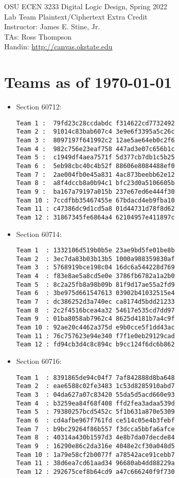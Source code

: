 \documentclass{article}
\newcommand{\mycourse}{\textsc OSU ECEN 3233 Digital Logic Design, Spring 2022}
\newcommand{\myassignment}{\textsc Lab Team Plaintext/Ciphertext Extra Credit}
\newcommand{\myinstructor}{Instructor: James E. Stine, Jr.}
\newcommand{\mytas}{TAs: Ross Thompson}
\newcommand{\myhandin}{Handin: \url{http://canvas.okstate.edu}}
\begin{document}
\begin{center}
  {\large \mycourse} \\
  \vspace{0.1in}
  {\large \myassignment} \\
  \vspace{0.25in} 
  \myinstructor \\
  \mytas \\
  \vspace{0.25in} 
  \myhandin \\
\end{center}

\vspace{0.25in}
\noindent

\section{Teams as of \today}

{\footnotesize
\begin{itemize}
\item Section 60712:  
\begin{verbatim}
Team 1 :  79fd23c28ccdabdc f314622cd7732492
Team 2 :  91014c83bab607c4 3e9e6f3395a5c26c
Team 3 :  8097197f641992c2 12ae5ae64eb0c2f6
Team 4 :  982c756e23eaf758 447ad3e07c656b1c
Team 5 :  c1949df4aea7571f 5d377cb7db1c5b25
Team 6 :  5eb98cbc40c4b52f 88606e8084488ef0
Team 7 :  2ae004fb0e45a831 4ac873beebb62e12
Team 8 :  a8f4dccb8a0b94c1 bfc23d0a5106605b
Team 9 :  ba167a79197a015b 237e67ed6e444f30
Team 10 : 7ccdfbb35467455e 67bdacd4eb9fba10
Team 11 : c47386dc9d1cd5a8 01d44731d78f8d62
Team 12 : 31867345fe6864a4 62104957e411897c
\end{verbatim}
\item Section 60714:
\begin{verbatim}
Team 1  : 1332106d519b0b5e 23ae9bd5fe01be8b  
Team 2  : 3ec7da83b03b13b5 1000a988359830af 
Team 3  : 5768919bce198c04 16dc6a544228d769 
Team 4  : f83e8ae5a8cd5e0e 3786fb6782a1a2b0 
Team 5  : 8c2a25fb8a98b09b 81f9d17ae55a2fd9 
Team 6  : 3be975d661547613 03902b41032515e4 
Team 7  : dc386252d3a740ec ca8174d5bdd21233 
Team 8  : 2c2f4516bcea4a32 54617e535cd7dd97 
Team 9  : 01ba8058ab7962c4 8625d4181b7a4c9f 
Team 10 : 92ae20c4462a375d e9b0cce5f1dd43ac 
Team 11 : 76c757623e94e340 f7f1e0eb29129cad 
Team 12 : fd94cb3d4c8c894c b9cc124f6dc6b862 
\end{verbatim}

\item Section 60716:
\begin{verbatim}
Team 1  : 8391865de94c04f7 7af842888d8ba648 
Team 2  : eae6588c02fe3483 1c53d8285910abd7 
Team 3  : 04da627a07c83420 55da5d5acd660e93 
Team 4  : b3259ea84f68f408 ffd2fea3adaa539d 
Team 5  : 79380257bcd5452c 5f1b631a870e5309 
Team 6  : cd4afbe967f761fd ce514c05e4b3febf 
Team 7  : b9bc29264f86b557 f3dcca5bbfa6afce 
Team 8  : 40314a430b1597d3 4e8b7da07decde84 
Team 9  : 16290e86c2da316e 4048e2cf30a048d5 
Team 10 : 1a79e58cf2b0077f a78542ace91cebb7 
Team 11 : 38d6ea7cd61aad34 96680ab4dd88229a 
Team 12 : 292675cef8b64cd9 a47c666240f9f730 
\end{verbatim}

\end{itemize}
}



\end{document}
